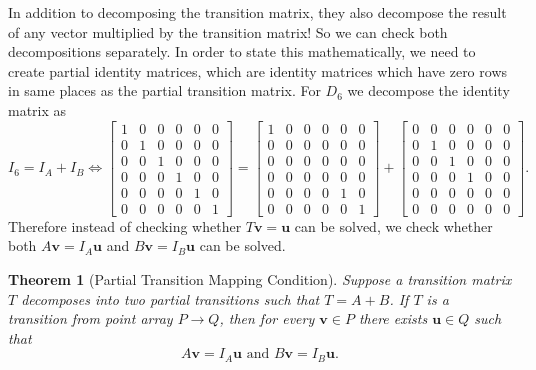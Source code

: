 \documentclass[a4paper,10pt]{article}
\theoremstyle{plain}
\newtheorem{Theorem}{Theorem}
\theoremstyle{definition}
\theoremstyle{remark}
\renewcommand{\vec}[1]{\mathbf{#1}}
\begin{document}
In addition to decomposing the transition matrix, they also decompose the result of any vector multiplied by the transition matrix!
So we can check both decompositions separately.
In order to state this mathematically, we need to create partial identity matrices, which are identity matrices which have zero rows in same places as the partial transition matrix.
For \( D_6 \) we decompose the identity matrix as 
\begin{equation}
	I_6 = I_A + I_B
	\iff
	\begin{bmatrix}
		1 & 0 & 0 & 0 & 0 & 0 \\
		0 & 1 & 0 & 0 & 0 & 0 \\
		0 & 0 & 1 & 0 & 0 & 0 \\
		0 & 0 & 0 & 1 & 0 & 0 \\
		0 & 0 & 0 & 0 & 1 & 0 \\
		0 & 0 & 0 & 0 & 0 & 1
	\end{bmatrix}
	=
	\begin{bmatrix}
		1 & 0 & 0 & 0 & 0 & 0 \\
		0 & 0 & 0 & 0 & 0 & 0 \\
		0 & 0 & 0 & 0 & 0 & 0 \\
		0 & 0 & 0 & 0 & 0 & 0 \\
		0 & 0 & 0 & 0 & 1 & 0 \\
		0 & 0 & 0 & 0 & 0 & 1
	\end{bmatrix}
	+
	\begin{bmatrix}
		0 & 0 & 0 & 0 & 0 & 0 \\
		0 & 1 & 0 & 0 & 0 & 0 \\
		0 & 0 & 1 & 0 & 0 & 0 \\
		0 & 0 & 0 & 1 & 0 & 0 \\
		0 & 0 & 0 & 0 & 0 & 0 \\
		0 & 0 & 0 & 0 & 0 & 0
	\end{bmatrix}.
\end{equation}
Therefore instead of checking whether \( T\vec{v} = \vec{u} \) can be solved, we check whether both \( A\vec{v} = I_A\vec{u} \) and \( B\vec{v} = I_B\vec{u} \) can be solved.

\begin{Theorem}[Partial Transition Mapping Condition]
	Suppose a transition matrix \( T \) decomposes into two partial transitions such that \( T = A + B \).
	If \( T \) is a transition from point array \( P \to Q \), then for every \( \vec{v} \in P \) there exists \( \vec{u} \in Q \) such that
	\[A\vec{v} = I_A\vec{u} \text{ and } B\vec{v} = I_B\vec{u}.\]
	\label{thrm:partial-transition-mapping-condition}
\end{Theorem}
\end{document}
